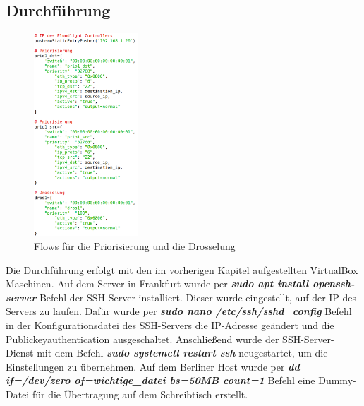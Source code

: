 \documentclass[fontsize=12pt,paper=a4,open=any,parskip=half,
  twoside=false,toc=listof,toc=bibliography,fleqn,leqno,
  captions=nooneline,captions=tableabove,british]{scrbook}
\begin{document}
\subsection{Durchführung}
\begin{figure}
 \centering
 \includegraphics[width=0.35\textwidth]{Bilder/transfer-flow}
 \caption{Flows für die Priorisierung und die Drosselung}
 \label{transfer-flow}
\end{figure}
Die Durchführung erfolgt mit den im vorherigen Kapitel aufgestellten VirtualBox Maschinen. Auf dem Server in Frankfurt wurde per \textit{\textbf{sudo apt install openssh-server}} Befehl der SSH-Server installiert. Dieser wurde eingestellt, auf der IP des Servers zu laufen. Dafür wurde per \textit{\textbf{sudo nano /etc/ssh/sshd\_config}} Befehl in der Konfigurationsdatei des SSH-Servers die IP-Adresse geändert und die Publickeyauthentication ausgeschaltet. Anschließend wurde der SSH-Server-Dienst mit dem Befehl \textit{\textbf{sudo systemctl restart ssh}} neugestartet, um die Einstellungen zu übernehmen. Auf dem Berliner Host wurde per \textit{\textbf{dd if=/dev/zero of=wichtige\_datei bs=50MB count=1}} Befehl eine Dummy-Datei für die Übertragung auf dem Schreibtisch erstellt.\par
\end{document}
